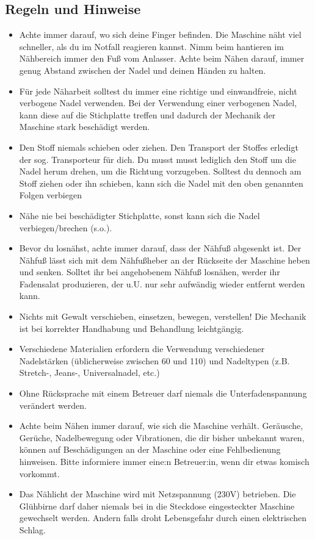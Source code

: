 \documentclass{\basedir/fablab-document}
\begin{document}
\subsection{Regeln und Hinweise}
\begin{itemize}
	\item Achte immer darauf, wo sich deine Finger befinden. Die Maschine näht viel schneller, als du im Notfall reagieren kannst. Nimm beim hantieren im Nähbereich immer den Fuß vom Anlasser. Achte beim Nähen darauf, immer genug Abstand zwischen der Nadel und deinen Händen zu halten.
	\item Für jede Näharbeit solltest du immer eine richtige und einwandfreie, nicht verbogene Nadel verwenden. Bei der Verwendung einer verbogenen Nadel, kann diese auf die Stichplatte treffen und dadurch der Mechanik der Maschine stark beschädigt werden.
	\item Den Stoff niemals schieben oder ziehen. Den Transport der Stoffes erledigt der sog. Transporteur für dich. Du musst musst lediglich den Stoff um die Nadel herum drehen, um die Richtung vorzugeben. Solltest du dennoch am Stoff ziehen oder ihn schieben, kann sich die Nadel mit den oben genannten Folgen verbiegen
	\item Nähe nie bei beschädigter Stichplatte, sonst kann sich die Nadel verbiegen/brechen (s.o.).
	\item Bevor du losnähst, achte immer darauf, dass der Nähfuß abgesenkt ist. Der Nähfuß lässt sich mit dem Nähfußheber an der Rückseite der Maschine heben und senken. Solltet ihr bei angehobenem Nähfuß losnähen, werder ihr Fadensalat produzieren, der u.U. nur sehr aufwändig wieder entfernt werden kann.
	\item Nichts mit Gewalt verschieben, einsetzen, bewegen, verstellen! Die Mechanik ist bei korrekter Handhabung und Behandlung leichtgängig.
	\item Verschiedene Materialien erfordern die Verwendung verschiedener Nadelstärken (üblicherweise zwischen 60 und 110) und Nadeltypen (z.B. Stretch-, Jeans-,  Universalnadel, etc.)
	\item Ohne Rücksprache mit einem Betreuer darf niemals die Unterfadenspannung verändert werden.
	\item Achte beim Nähen immer darauf, wie sich die Maschine verhält. Geräusche, Gerüche, Nadelbewegung oder Vibrationen, die dir bisher unbekannt waren, können auf Beschädigungen an der Maschine oder eine Fehlbedienung hinweisen. Bitte informiere immer eine:n Betreuer:in, wenn dir etwas komisch vorkommt.
	\item Das Nählicht der Maschine wird mit Netzspannung (230V) betrieben. Die Glühbirne darf daher niemals bei in die Steckdose eingesteckter Maschine gewechselt werden. Andern falls droht Lebensgefahr durch einen elektrischen Schlag.

\end{itemize}
\end{document}
